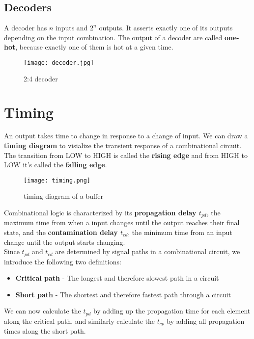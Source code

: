 \subsection{Decoders}
A decoder has $n$ inputs and $2^n$ outputs. It asserts exactly one of its outputs depending on the input combination.
The output of a decoder are called \textbf{one-hot}, because exactly one of them is hot at a given time.

\begin{figure}[h]
    \centering
    \texttt{[image: decoder.jpg]}
    \caption{2:4 decoder}
\end{figure}

\pagebreak
\section{Timing}
An output takes time to change in response to a change of input. We can draw a \textbf{timing diagram} to visialize the
transient response of a combinational circuit. The transition from LOW to HIGH is called the \textbf{rising edge} and from HIGH
to LOW it's called the \textbf{falling edge}. 

\begin{figure}[h]
    \centering
    \texttt{[image: timing.png]}
    \caption{timing diagram of a buffer}
\end{figure}

Combinational logic is characterized by its \textbf{propagation delay $t_{pd}$}, the maximum time from when a input changes
until the output reaches their final state, and the \textbf{contamination delay $t_{cd}$}, the minimum time from an input 
change until the output starts changing. \\

Since $t_{pd}$ and $t_{cd}$ are determined by signal paths in a combinational circuit, we introduce the following two 
definitions: 
\begin{itemize}
    \item \textbf{Critical path} - The longest and therefore slowest path in a circuit
    \item \textbf{Short path} - The shortest and therefore fastest path through a circuit
\end{itemize}
We can now calculate the $t_{pd}$ by adding up the propagation time for each element along the critical path, and similarly calculate 
the $t_{cp}$ by adding all propagation times along the short path.